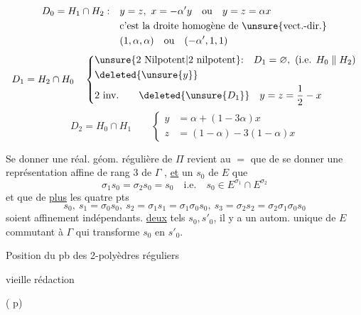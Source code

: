 \[
\begin{aligned}
 D_0=H_1\cap H_2:\quad &y=z,\ x=-\alpha'y\quad\text{ou}\quad y=z=\alpha x\\
 &\text{c'est la droite homogène de \unsure{vect.-dir.}}\\
 &(1,\alpha,\alpha)\quad\text{ou}\quad(-\alpha',1,1)
\end{aligned}
\]
\[
 D_1=H_2\cap H_0\quad
 \left\{\begin{aligned}
 &\text{\unsure{2 Nilpotent|2 nilpotent}:}\quad D_1=\varnothing,\ (\text{i.e. }H_0\parallel H_2)\\
 &\deleted{\unsure{y}}\\
 &\text{2 inv.}\qquad\deleted{\unsure{D_1}}\quad y=z=\frac12-x
 \end{aligned}\right.
\]
\[
 D_2=H_0\cap H_1\qquad
 \left\{\begin{aligned}
 y&=\alpha+(1-3\alpha)x\\
 z&=(1-\alpha)-3(1-\alpha)x
 \end{aligned}\right.
\]

Se donner une réal. géom. régulière de $\Pi$ revient au $=$ que de se donner une représentation affine de rang 3 de $\Gamma$ , \uline{et} un   $s_0$ de $E$  que
\[
 \sigma_1s_0=\sigma_2s_0=s_0\quad\text{i.e.}\quad s_0\in E^{\sigma_1}\cap E^{\sigma_2}
\]
et  que de \uline{plus} les quatre pts
\[
 s_0,\ s_1=\sigma_0s_0,\ s_2=\sigma_1s_1=\sigma_1\sigma_0s_0,\ s_3=\sigma_2s_2=\sigma_2\sigma_1\sigma_0s_0
\]
soient affinement indépendants.    \uline{deux} tels $s_0,s'_0$, il y a un autom. unique de $E$ commutant à $\Gamma$ qui transforme $s_0$ en $s'_0$.


Position du pb des 2-polyèdres réguliers

vieille rédaction

( p)

